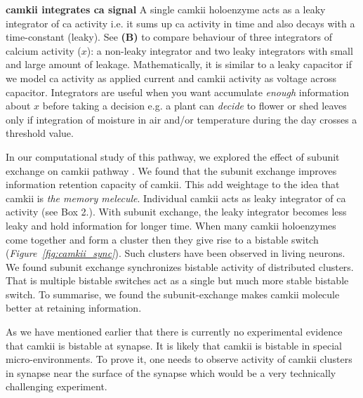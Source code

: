 \documentclass[]{resonance}
\newcommand\Fig[1]{\textit{Figure~\ref{#1}}}
\begin{document}
{    \textbf{\gls{camkii} integrates \gls{ca} signal} A single \gls{camkii}
    holoenzyme acts as a leaky integrator of \gls{ca} activity i.e. it sums up
    \gls{ca} activity in time and also decays with a time-constant (leaky). See
    \textbf{(B)} to compare behaviour of three integrators of calcium activity
    ($x$): a non-leaky integrator and two leaky integrators with small and large
    amount of leakage.  Mathematically, it is similar to a leaky capacitor if we
    model \gls{ca} activity as applied current and \gls{camkii} activity as
    voltage across capacitor.  Integrators are useful when you want accumulate
    \emph{enough} information about $x$ before taking a decision e.g. a plant
    can \emph{decide} to flower or shed leaves only if integration of moisture
    in air and/or temperature during the day crosses a threshold value.

} %

In our computational study of this pathway, we explored the effect of subunit
exchange on \gls{camkii} pathway \cite{SinghAndBhalla2018}.  We found that the
subunit exchange improves information retention capacity of \gls{camkii}. This
add weightage to the idea that \gls{camkii} is \textit{the memory melecule}.
Individual \gls{camkii} acts as leaky integrator of \gls{ca} activity (see Box
2.). With subunit exchange, the leaky integrator becomes less leaky and hold
information for longer time. When many \gls{camkii} holoenzymes come together
and form a cluster then they give rise to a bistable switch
(\Fig{fig:camkii_sync}). Such clusters have been observed in living neurons. We
found subunit exchange synchronizes bistable activity of distributed clusters.
That is multiple bistable switches act as a single but much more stable bistable
switch. To summarise, we found the subunit-exchange makes \gls{camkii} molecule
better at retaining information. 

As we have mentioned earlier that there is currently no experimental evidence
that \gls{camkii} is bistable at synapse. It is likely that \gls{camkii} is
bistable in special micro-environments. To prove it, one needs to observe
activity of \gls{camkii} clusters in synapse near the surface of the synapse
which would be a very technically challenging experiment.
\end{document}
